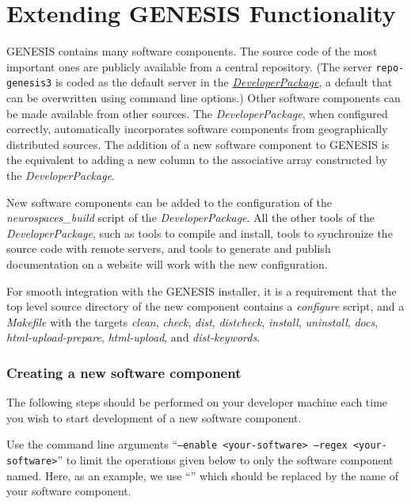 \documentclass[12pt]{article}
\begin{document}
\section*{Extending GENESIS Functionality}

GENESIS contains many software components. The source code of the most
important ones are publicly available from a central repository. (The
server {\tt repo-genesis3} is coded as the default server in
the \href{../developer-package/developer-package.tex}{\it DeveloperPackage}, 
a default that can be overwritten using command line
options.) Other software components can be made available from other
sources. The {\it DeveloperPackage}, when configured correctly,
automatically incorporates software components from geographically
distributed sources. The addition of a new software component to GENESIS is the equivalent to adding a new column to the associative array constructed by the {\it DeveloperPackage}. 

New software components can be added to the configuration of the {\it
  neurospaces\_build} script of the {\it DeveloperPackage}. All the other tools of the
{\it DeveloperPackage}, such as tools to compile and install, tools to synchronize
the source code with remote servers, and tools to generate and publish
documentation on a website will work with the new configuration.

For smooth integration with the GENESIS installer, it is a requirement that the top level source directory of the new component contains a {\it configure} script, and a {\it Makefile} with the targets {\it clean}, {\it check}, {\it dist}, {\it distcheck}, {\it install}, {\it uninstall}, {\it docs}, {\it html-upload-prepare}, {\it html-upload}, and {\it dist-keywords}.

\subsubsection*{Creating a new software component}

The following steps should be performed on your developer machine each time you wish to start development of a new software component.

Use the command line arguments ``{\tt --enable <your-software> --regex <your-software>}'' to limit the operations given below to only the software component named. Here, as an example, we use ``{\tt <your-software>}'' which should be replaced by the name of your software component. 
\end{document}
